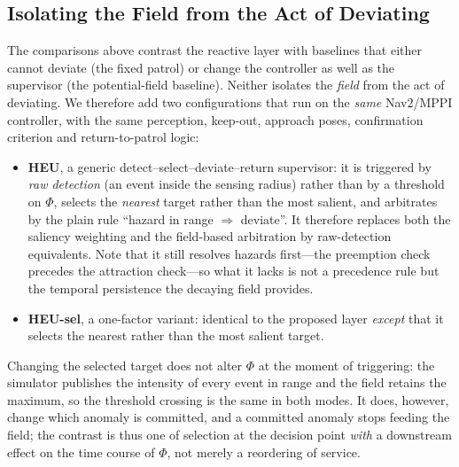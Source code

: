 \subsection{Isolating the Field from the Act of Deviating}
\label{sec:heu}
The comparisons above contrast the reactive layer with baselines that either cannot
deviate (the fixed patrol) or change the controller as well as the supervisor (the
potential-field baseline). Neither isolates the \emph{field} from the act of
deviating. We therefore add two configurations that run on the \emph{same}
Nav2/MPPI controller, with the same perception, keep-out, approach poses,
confirmation criterion and return-to-patrol logic:
\begin{itemize}
\item \textbf{HEU}, a generic detect--select--deviate--return supervisor: it is
triggered by \emph{raw detection} (an event inside the sensing radius) rather than by
a threshold on $\Phi$, selects the \emph{nearest} target rather than the most
salient, and arbitrates by the plain rule ``hazard in range $\Rightarrow$ deviate''.
It therefore replaces both the saliency weighting and the field-based arbitration by
raw-detection equivalents. Note that it still resolves hazards first---the preemption
check precedes the attraction check---so what it lacks is not a precedence rule but
the temporal persistence the decaying field provides.
\item \textbf{HEU-sel}, a one-factor variant: identical to the proposed layer
\emph{except} that it selects the nearest rather than the most salient target.
\end{itemize}
Changing the selected target does not alter $\Phi$ at the moment of triggering: the
simulator publishes the intensity of every event in range and the field retains the
maximum, so the threshold crossing is the same in both modes. It does, however, change
which anomaly is committed, and a committed anomaly stops feeding the field; the
contrast is thus one of selection at the decision point \emph{with} a downstream
effect on the time course of $\Phi$, not merely a reordering of service.

